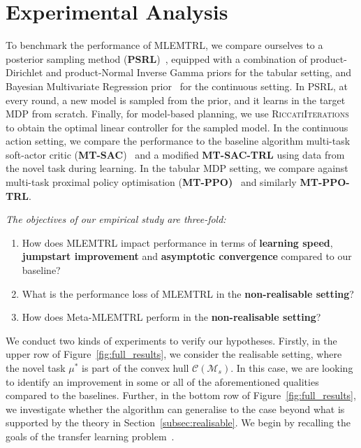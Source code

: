 \section{Experimental Analysis}\label{sec:experiments}

To benchmark the performance of MLEMTRL, we compare ourselves to a posterior sampling method (\textbf{PSRL})~\citep{osband2013more}, equipped with a combination of product-Dirichlet and product-Normal Inverse Gamma priors for the tabular setting, and Bayesian Multivariate Regression prior~\citep{minka2000bayesian} for the continuous setting. In PSRL, at every round, a new model is sampled from the prior, and it learns in the target MDP from scratch. Finally, for model-based planning, we use \textsc{RiccatiIterations} to obtain the optimal linear controller for the sampled model. In the continuous action setting, we compare the performance to the baseline algorithm multi-task soft-actor critic (\textbf{MT-SAC})~\citep{haarnoja2018soft, yu2020meta} and a modified \textbf{MT-SAC-TRL} using data from the novel task during learning. In the tabular MDP setting, we compare against multi-task proximal policy optimisation (\textbf{MT-PPO)}~\citep{schulman2017proximal, yu2020meta} and similarly \textbf{MT-PPO-TRL}.%



\textit{The objectives of our empirical study are three-fold:}%
\begin{enumerate}
    \item How does \textsc{MLEMTRL} impact performance in terms of \textbf{learning speed}, \textbf{jumpstart improvement} and \textbf{asymptotic convergence} compared to our baseline?
    \item What is the performance loss of \textsc{MLEMTRL} in the \textbf{non-realisable setting}?
    \item How does Meta-MLEMTRL perform in the \textbf{non-realisable setting}?
\end{enumerate}

We conduct two kinds of experiments to verify our hypotheses. Firstly, in the upper row of Figure~\ref{fig:full_results}, we consider the realisable setting, where the novel task $\mu^*$ is part of the convex hull $\mathcal{C}(\mathcal{M}_s)$. In this case, we are looking to identify an improvement in some or all of the aforementioned qualities compared to the baselines.
Further, in the bottom row of Figure~\ref{fig:full_results}, we investigate whether the algorithm can generalise to the case beyond what is supported by the theory in Section~\ref{subsec:realisable}. We begin by recalling the goals of the transfer learning problem~\citep{langley2006transfer}.%



